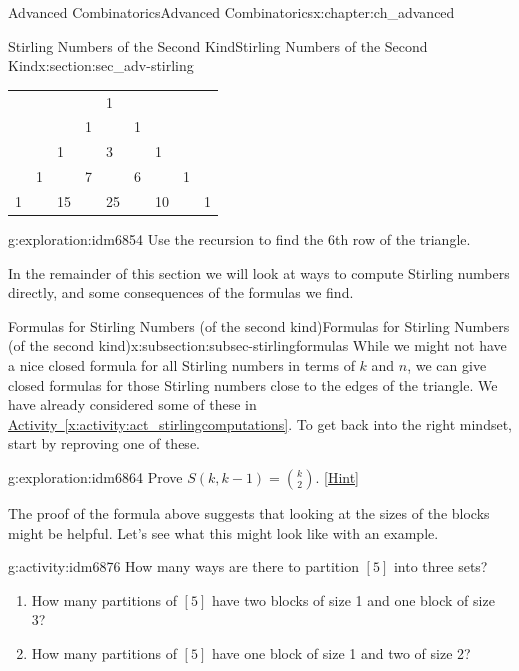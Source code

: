 \documentclass[oneside,10pt,]{book}
\numberwithin{equation}{chapter}
\begin{document}
\begin{chapterptx}{Advanced Combinatorics}{}{Advanced Combinatorics}{}{}{x:chapter:ch_advanced}
\begin{sectionptx}{Stirling Numbers of the Second Kind}{}{Stirling Numbers of the Second Kind}{}{}{x:section:sec_adv-stirling}
\begin{introduction}{}
\begin{sidebyside}{1}{0.25}{0.25}{0}
\begin{sbspanel}{0.5}%
{\centering%
\begin{tabular}{lllllllll}
&&&&1&&&&\tabularnewline[0pt]
&&&1&&1&&&\tabularnewline[0pt]
&&1&&3&&1&&\tabularnewline[0pt]
&1&&7&&6&&1&\tabularnewline[0pt]
1&&15&&25&&10&&1
\end{tabular}
\par}
\end{sbspanel}%
\end{sidebyside}%
\begin{exploration}{}{g:exploration:idm6854}%
Use the recursion to find the 6th row of the triangle.%
\end{exploration}
In the remainder of this section we will look at ways to compute Stirling numbers directly, and some consequences of the formulas we find.%
\end{introduction}%
%
%
\typeout{************************************************}
\typeout{************************************************}
%
\begin{subsectionptx}{Formulas for Stirling Numbers (of the second kind)}{}{Formulas for Stirling Numbers (of the second kind)}{}{}{x:subsection:subsec-stirlingformulas}
While we might not have a nice closed formula for all Stirling numbers in terms of \(k\) and \(n\), we can give closed formulas for those Stirling numbers close to the edges of the triangle.  We have already considered some of these in \hyperref[x:activity:act_stirlingcomputations]{Activity~\ref{x:activity:act_stirlingcomputations}}.  To get back into the right mindset, start by reproving one of these.%
\begin{exploration}{}{g:exploration:idm6864}%
Prove \(S(k, k-1) = \binom{k}{2}\).%
\space\hspace*{0pt}\hfill{\tiny\hyperlink{g:hint:idm6868-back}{[Hint]}}\end{exploration}
The proof of the formula above suggests that looking at the sizes of the blocks might be helpful.  Let's see what this might look like with an example.%
\begin{activity}{}{g:activity:idm6876}%
How many ways are there to partition \([5]\) into three sets?%
\begin{enumerate}[font=\bfseries,label=(\alph*),ref=\alph*]
\item{}How many partitions of \([5]\) have two blocks of size 1 and one block of size 3?%
\item{}How many partitions of \([5]\) have one block of size 1 and two of size 2?%

\end{enumerate}
\end{activity}
\end{subsectionptx}
\end{sectionptx}
\end{chapterptx}
\end{document}
